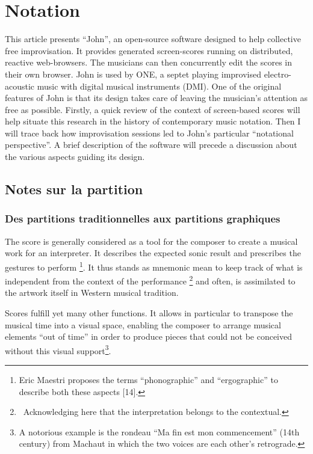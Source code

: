 %
\chapter{Notation}
\label{ch:notation}


This article presents “John”, an open-source software designed to help collective free improvisation. It provides generated screen-scores running on distributed, reactive web-browsers. The musicians can then concurrently edit the scores in their own browser. John is used by ONE, a septet playing improvised electro-acoustic music with digital musical instruments (DMI). One of the original features of John is that its design takes care of leaving the
musician's attention as free as possible.
Firstly, a quick review of the context of screen-based
scores will help situate this research in the history of contemporary music notation. Then I will trace back how improvisation sessions led to John's particular “notational perspective”. A brief description of the software will precede a discussion about the various aspects guiding its
design.


\section{Notes sur la partition}

\subsection{Des partitions traditionnelles aux partitions graphiques}
The score is generally considered as a tool for the composer to create a musical work for an interpreter. It describes the expected sonic result and prescribes the gestures to perform \footnote{Eric Maestri proposes the terms “phonographic” and “ergographic” to describe both these aspects [14].}. It thus stands as mnemonic mean to keep track of what is independent from the context of the performance \footnote{ Acknowledging here that the interpretation belongs to the contextual.} and often, is assimilated to the artwork itself in Western musical tradition.

Scores fulfill yet many other functions. It allows in particular to transpose the musical time into a visual space, enabling the composer to arrange musical elements “out of time” in order to produce pieces that could not be conceived without this visual support\footnote{A notorious example is the rondeau “Ma fin est mon commencement” (14th century) from Machaut in which the two voices are each other's retrograde.}.

